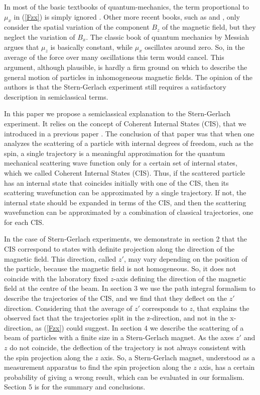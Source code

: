 \documentclass[aps,preprint,prl]{revtex4-2}
\begin{document}
In most of the basic textbooks of quantum-mechanics, the term proportional to
$\mu_x$ in (\ref{Fzx}) is simply ignored \cite{eis}.   Other more recent 
books, such as \cite{lev} and \cite{mer}, only consider the spatial variation
of the component $B_z$ of the magnetic field, but they neglect the variation
of $B_x$. The classic book of quantum mechanics
by Messiah \cite{mes} argues that  $\mu_z$ is basically
constant, while $\mu_x$ oscillates around zero. So, in the average of the force
over many oscillations this term would cancel. This argument, although 
plausible, is hardly a firm ground on which to describe the general motion of
particles in inhomogeneous magnetic fields.
The opinion of the authors is that the Stern-Gerlach experiment still requires
a satisfactory description in semiclassical terms. 

In this paper we propose a semiclassical explanation to the Stern-Gerlach 
experiment. It relies on the concept of Coherent Internal States (CIS), that we
introduced in a previous paper \cite{sara}. The conclusion of that paper 
was that when one analyzes the scattering of a particle with
internal degrees of freedom, such as the spin, a single  trajectory  is a
meaningful approximation for the quantum mechanical scattering wave function
only for a certain set of internal states, which we called Coherent Internal
States (CIS). Thus, if the scattered particle has an internal state that 
coincides initially with one of the CIS, then its scattering wavefunction
can be approximated by a single trajectory. If not, the internal state
should be expanded in terms of the CIS, and then the scattering wavefunction
can be approximated by a combination of classical trajectories, one for each 
CIS.

In the case of Stern-Gerlach experiments, we demonstrate in section 2
that the CIS correspond to  states with definite projection along the 
direction of the magnetic field. This direction, called $z'$, may vary
depending on the position of the particle, because the magnetic field is not
homogeneous. So, it does not coincide with the laboratory fixed $z$-axis 
defining the
direction of the magnetic field at the centre of the beam. 
In section 3 we  use the path integral
formalism to describe the trajectories of the CIS, and we find that
they deflect on the $z'$ direction. Considering that the average of $z'$
corresponds to $z$, 
that explains the observed fact that 
the trajectories split in the z-direction, and not in the x-direction,
as (\ref{Fzx}) could suggest.
In section 4 we describe the scattering of a beam of particles with a 
finite size in a Stern-Gerlach magnet. As the axes $z'$ and $z$ do not
coincide,  the deflection of the trajectory is not always consistent with 
the spin projection along the $z$ axis. So, a Stern-Gerlach magnet, understood
as a measurement apparatus to find the spin projection along the $z$ axis,
has a certain probability  of giving a wrong result, which can be evaluated 
in our formalism. 
Section 5 is for the summary and 
conclusions.
\end{document}
